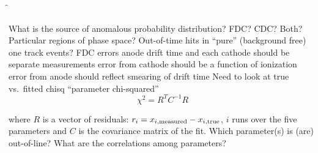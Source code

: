 \documentclass[xcolor=dvipsnames]{beamer}
\begin{document}
\f{
\be
\I What is the source of anomalous probability distribution?
  \be
  \I FDC? CDC? Both?
  \I Particular regions of phase space?
  \I Out-of-time hits in ``pure'' (background free) one track events?
  \ee
\I FDC errors
  \be
  \I anode drift time and each cathode should be separate measurements
  \I error from cathode should be a function of ionization
  \I error from anode should reflect smearing of drift time
  \ee
\I Need to look at true vs.\ fitted chisq ``parameter chi-squared''
$$
\chi^2 = R^T C^{-1} R
$$

where $R$ is a vector of residuals: $r_i = x_{i,{\rm measured}} - x_{i,{\rm true}}$, $i$ runs over the five parameters and $C$ is the covariance
matrix of the fit.
  \be
  \I Which parameter(s) is (are) out-of-line?
  \I What are the correlations among parameters?
  \ee
\ee
}
\end{document}
